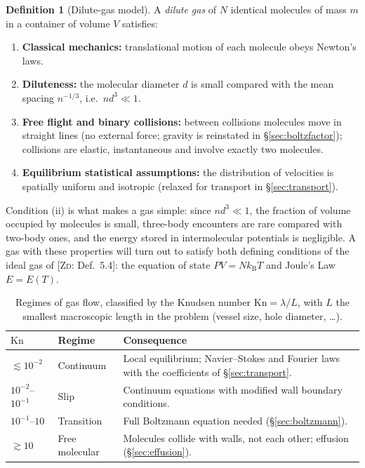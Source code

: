 \documentclass[11pt,a4paper]{report}
\theoremstyle{definition}
\newtheorem{definition}{Definition}[chapter]
\theoremstyle{plain}
\newcommand{\ZD}[1]{[\textsc{Zd}: #1]}   %
\newcommand{\kB}{k_{\mathrm{B}}}
\begin{document}
\begin{definition}[Dilute-gas model]\label{def:model}
A \emph{dilute gas} of $N$ identical molecules of mass $m$ in a container of volume $V$ satisfies:
\begin{enumerate}[label=(\roman*),nosep]
\item \textbf{Classical mechanics:} translational motion of each molecule obeys Newton's laws.
\item \textbf{Diluteness:} the molecular diameter $d$ is small compared with the mean spacing $n^{-1/3}$, i.e.\ $n d^3\ll1$.
\item \textbf{Free flight and binary collisions:} between collisions molecules move in straight lines (no external force; gravity is reinstated in \S\ref{sec:boltzfactor}); collisions are elastic, instantaneous and involve exactly two molecules.
\item \textbf{Equilibrium statistical assumptions:} the distribution of velocities is spatially uniform and isotropic (relaxed for transport in \S\ref{sec:transport}).
\end{enumerate}
\end{definition}

Condition (ii) is what makes a gas simple: since $nd^3\ll1$, the fraction of volume occupied by molecules is small, three-body encounters are rare compared with two-body ones, and the energy stored in intermolecular potentials is negligible. A gas with these properties will turn out to satisfy both defining conditions of the ideal gas of \ZD{Def.~5.4}: the equation of state $PV=N\kB T$ and Joule's Law $E=E(T)$.

\begin{table}[h]
\centering
\caption{Regimes of gas flow, classified by the Knudsen number $\mathrm{Kn}=\lambda/L$, with $L$ the smallest macroscopic length in the problem (vessel size, hole diameter, \dots).}
\label{tab:knudsen}
\begin{tabular}{@{}llp{7.2cm}@{}}
\toprule
$\mathrm{Kn}$ & Regime & Consequence\\
\midrule
$\lesssim 10^{-2}$ & Continuum & Local equilibrium; Navier--Stokes and Fourier laws with the coefficients of \S\ref{sec:transport}.\\
$10^{-2}$--$10^{-1}$ & Slip & Continuum equations with modified wall boundary conditions.\\
$10^{-1}$--$10$ & Transition & Full Boltzmann equation needed (\S\ref{sec:boltzmann}).\\
$\gtrsim 10$ & Free molecular & Molecules collide with walls, not each other; effusion (\S\ref{sec:effusion}).\\
\bottomrule
\end{tabular}
\end{table}
\end{document}
